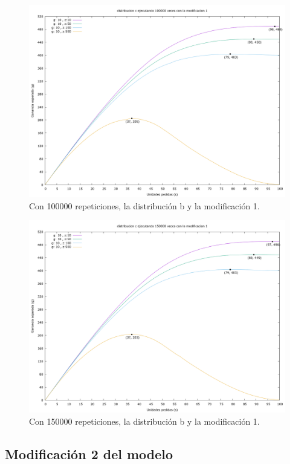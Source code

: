 \documentclass[12pt, spanish]{article}
\begin{document}
\begin{figure}[H]
	\centering
	\includegraphics[scale = 0.2]{prob_c/datos_c_100000_1.png}
	\caption{Con 100000 repeticiones, la distribución b y la modificación 1.}
	\label{fig:ej1_a_100000}

\end{figure}

\begin{figure}[H]
	\centering
	\includegraphics[scale = 0.2]{prob_c/datos_c_150000_1.png}
	\caption{Con 150000 repeticiones, la distribución b y la modificación 1.}
	\label{fig:ej1_a_150000}

\end{figure}

\subsection{Modificación 2 del modelo}
\end{document}
